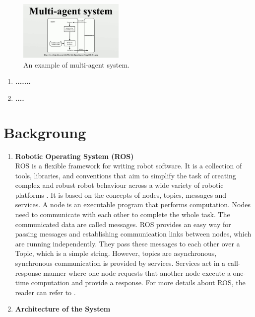 \documentclass[journal]{IEEEtran}
\begin{document}
\begin{figure}[!h]
\begin{center}
\includegraphics[width=2in]{one.jpg}
\caption{An example of multi-agent system. \cite{temp1}}
\end{center}
\label{fig:mypicture1}
\end{figure}




\begin{enumerate}
\item \textbf{.......}



\item \textbf{....}


\end{enumerate}



\section{Backgroung}
\begin{enumerate}
\item \textbf{Robotic Operating System (ROS)}\\
ROS is a flexible framework for writing robot software. It is a collection of tools, libraries, and conventions that aim to simplify the task of creating complex and robust robot behaviour across a wide variety of robotic platforms . It is based on the concepts of nodes, topics, messages and services. A node is an executable program that performs computation. Nodes need to communicate with each other to complete the whole task. The communicated data are called messages. ROS provides an easy way for passing messages and establishing communication links between nodes, which are running independently. They pass these messages to each other over a Topic, which is a simple string. However, topics are asynchronous, synchronous communication is provided by services. Services act in a call-response manner where one node requests that another node execute a one-time computation and provide a response. For more details about ROS, the reader can refer to \cite{temp2}.



\item \textbf{Architecture of the System}\\


\end{enumerate}
\end{document}
